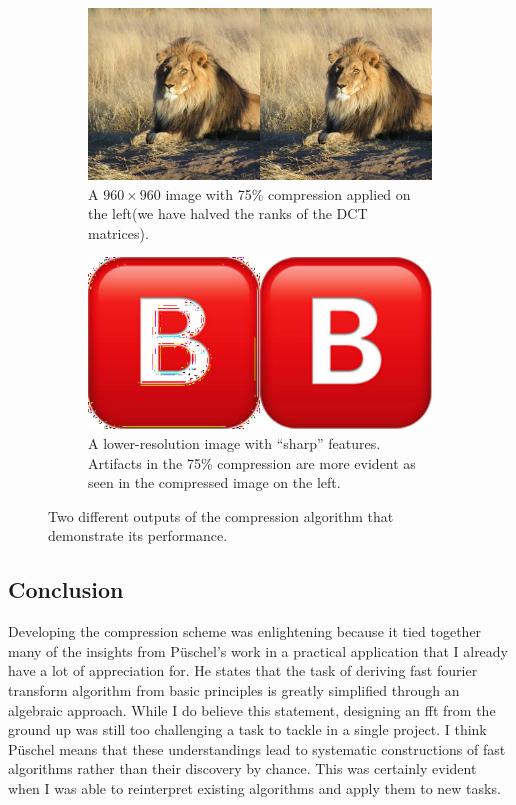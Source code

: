 \documentclass[12pt,technote]{IEEEtran}
\begin{document}
\begin{figure}[h]
    \centering
    \begin{subfigure}[m]{0.5\textwidth}
        \centering
        \includegraphics[width=\textwidth]{figures/lion_compare.jpg}
        \caption{A $960\times 960$ image with 75\% compression applied on the left(we have halved the ranks of the DCT matrices).}
        \label{fig:lion}
    \end{subfigure}
    \hfill
    \begin{subfigure}[b]{0.5\textwidth}
        \centering
        \includegraphics[width=\textwidth]{figures/b_compare.jpg}
        \caption{A lower-resolution image with ``sharp'' features. Artifacts in the 75\% compression are more evident as seen in the compressed image on the left.}
        \label{fig:letter_b}
    \end{subfigure}
    \caption{Two different outputs of the compression algorithm that demonstrate its performance.}
    \label{fig:compression_outputs}
\end{figure}
\subsection{Conclusion}
Developing the compression scheme was enlightening because it tied together many of the insights from P\"uschel's work in a practical application that I already have a lot of appreciation for. He states that the task of deriving fast fourier transform algorithm from basic principles is greatly simplified through an algebraic approach. While I do believe this statement, designing an fft from the ground up was still too challenging a task to tackle in a single project. I think P\"uschel means that these understandings lead to systematic constructions of fast algorithms rather than their discovery by chance. This was certainly evident when I was able to reinterpret existing algorithms and apply them to new tasks.


\end{document}
